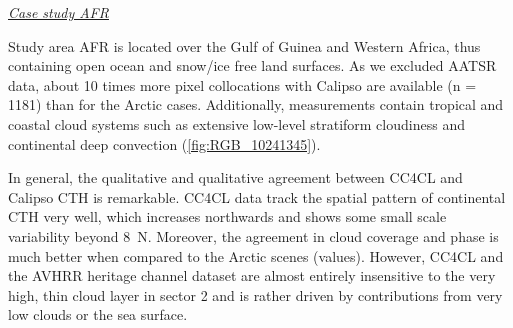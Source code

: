 


\vspace{5mm}\underline{\textit{Case study AFR}}\vspace{2mm}

Study area AFR is located over the Gulf of Guinea and Western Africa, thus containing open ocean and snow/ice free land surfaces. As we excluded AATSR data, about 10 times more pixel collocations with Calipso are available (n = 1181) than for the Arctic cases. Additionally, measurements contain tropical and coastal cloud systems such as extensive low-level stratiform cloudiness and continental deep convection (\cref{fig:RGB_10241345}).

In general, the qualitative and qualitative agreement between CC4CL and Calipso CTH is remarkable. CC4CL data track the spatial pattern of continental CTH very well, which increases northwards and shows some small scale variability beyond 8\textdegree\ N. Moreover, the agreement in cloud coverage and phase is much better when compared to the Arctic scenes (values). However, CC4CL and the AVHRR heritage channel dataset are almost entirely insensitive to the very high, thin cloud layer in sector 2 and is rather driven by contributions from very low clouds or the sea surface. 

